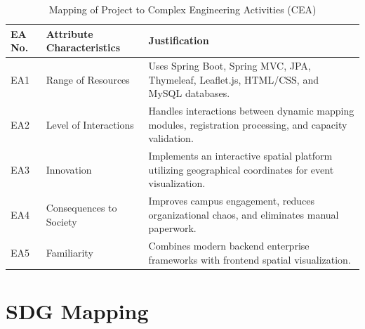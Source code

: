 \documentclass[10pt]{report}
\begin{document}
\begin{table}[h]
\centering
\caption{Mapping of Project to Complex Engineering Activities (CEA)}

\begin{tabular}{|p{1.5cm}|p{4cm}|p{8cm}|}
\hline
\textbf{EA No.} & \textbf{Attribute Characteristics} & \textbf{Justification} \\ \hline

EA1 & Range of Resources & Uses Spring Boot, Spring MVC, JPA, Thymeleaf, Leaflet.js, HTML/CSS, and MySQL databases. \\ \hline

EA2 & Level of Interactions & Handles interactions between dynamic mapping modules, registration processing, and capacity validation. \\ \hline

EA3 & Innovation & Implements an interactive spatial platform utilizing geographical coordinates for event visualization. \\ \hline

EA4 & Consequences to Society & Improves campus engagement, reduces organizational chaos, and eliminates manual paperwork. \\ \hline

EA5 & Familiarity & Combines modern backend enterprise frameworks with frontend spatial visualization. \\ \hline

\end{tabular}
\end{table}

\section{SDG Mapping}
\end{document}
